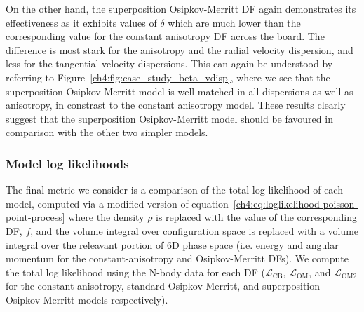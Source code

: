 On the other hand, the superposition Osipkov-Merritt DF again demonstrates its effectiveness as it exhibits values of $\delta$ which are much lower than the corresponding value for the constant anisotropy DF across the board. The difference is most stark for the anisotropy and the radial velocity dispersion, and less for the tangential velocity dispersions. This can again be understood by referring to Figure~\ref{ch4:fig:case_study_beta_vdisp}, where we see that the superposition Osipkov-Merritt model is well-matched in all dispersions as well as anisotropy, in constrast to the constant anisotropy model. These results clearly suggest that the superposition Osipkov-Merritt model should be favoured in comparison with the other two simpler models.

\subsubsection{Model log likelihoods}
\label{ch4:subsubsec:model-loglikelihoods}

The final metric we consider is a comparison of the total log likelihood of each model, computed via a modified version of equation~\eqref{ch4:eq:loglikelihood-poisson-point-process} where the density $\rho$ is replaced with the value of the corresponding DF, $f$, and the volume integral over configuration space is replaced with a volume integral over the releavant portion of 6D phase space (i.e. energy and angular momentum for the constant-anisotropy and Osipkov-Merritt DFs). We compute the total log likelihood using the N-body data for each DF ($\mathcal{L}_\mathrm{CB}$, $\mathcal{L}_\mathrm{OM}$, and $\mathcal{L}_\mathrm{OM2}$ for the constant anisotropy, standard Osipkov-Merritt, and superposition Osipkov-Merritt models respectively).

